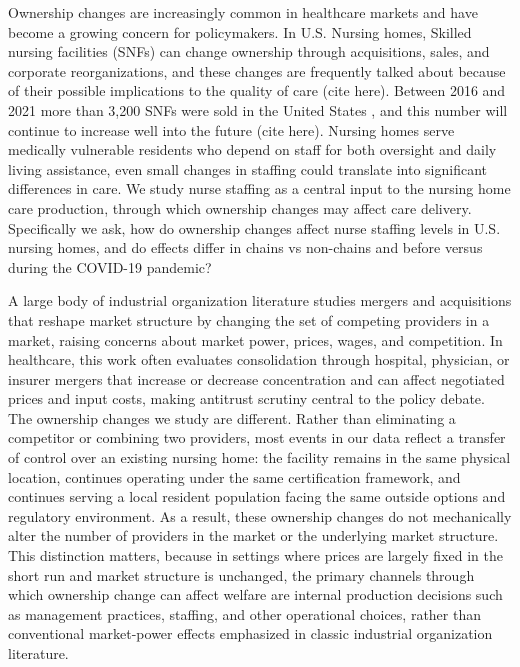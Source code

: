 \documentclass[12pt]{article}
\begin{document}
Ownership changes are increasingly common in healthcare markets and have become a growing concern for policymakers. In U.S. Nursing homes, Skilled nursing facilities (SNFs) can change ownership through acquisitions, sales, and corporate reorganizations, and these changes are frequently talked about because of their possible implications to the quality of care (cite here). Between 2016 and 2021 more than 3,200 SNFs were sold in the United States \citep{prusynski_humbert_mroz_2023}, and this number will continue to increase well into the future (cite here). Nursing homes serve medically vulnerable residents who depend on staff for both oversight and daily living assistance, even small changes in staffing could translate into significant differences in care. We study nurse staffing as a central input to the nursing home care production, through which ownership changes may affect care delivery. Specifically we ask, how do ownership changes affect nurse staffing levels in U.S. nursing homes, and do effects differ in chains vs non-chains and before versus during the COVID-19 pandemic?

A large body of industrial organization literature studies mergers and acquisitions that reshape market structure by changing the set of competing providers in a market, raising concerns about market power, prices, wages, and competition. In healthcare, this work often evaluates consolidation through hospital, physician, or insurer mergers that increase or decrease concentration and can affect negotiated prices and input costs, making antitrust scrutiny central to the policy debate. The ownership changes we study are different. Rather than eliminating a competitor or combining two providers, most events in our data reflect a transfer of control over an existing nursing home: the facility remains in the same physical location, continues operating under the same certification framework, and continues serving a local resident population facing the same outside options and regulatory environment. As a result, these ownership changes do not mechanically alter the number of providers in the market or the underlying market structure. This distinction matters, because in settings where prices are largely fixed in the short run and market structure is unchanged, the primary channels through which ownership change can affect welfare are internal production decisions such as management practices, staffing, and other operational choices, rather than conventional market-power effects emphasized in classic industrial organization literature.
\end{document}

